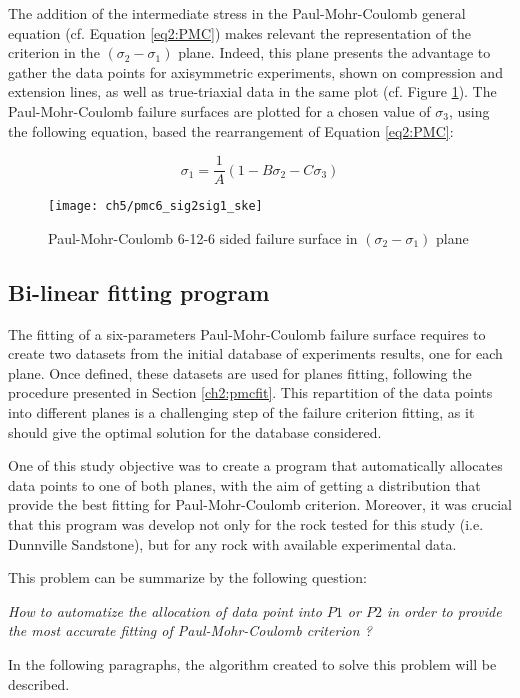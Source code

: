 The addition of the intermediate stress in the Paul-Mohr-Coulomb general equation (cf. Equation \ref{eq2:PMC}) makes relevant the representation of the criterion in the $(\sigma_2-\sigma_1)$ plane. Indeed, this plane presents the advantage to gather the data points for axisymmetric experiments, shown on compression and extension lines, as well as true-triaxial data in the same plot (cf. Figure \ref{fig5:6pmc_sig2sig1}). The Paul-Mohr-Coulomb failure surfaces are plotted for a chosen value of $\sigma_3$, using the following equation, based the rearrangement of Equation \ref{eq2:PMC}:

\begin{equation}\label{eq5:pmc_sig2sig1}
    \sigma_1 = \frac{1}{A}\left(1-B\sigma_{2}-C\sigma_{3}\right)
\end{equation}
\begin{figure}
    \centering
    \texttt{[image: ch5/pmc6\_sig2sig1\_ske]}
    \caption{Paul-Mohr-Coulomb 6-12-6 sided failure surface in $(\sigma_2-\sigma_1)$ plane}
    \label{fig5:6pmc_sig2sig1}
\end{figure}

\subsection{Bi-linear fitting program}

The fitting of a six-parameters Paul-Mohr-Coulomb failure surface requires to create two datasets from the initial database of experiments results, one for each plane. Once defined, these datasets are used for planes fitting, following the procedure presented in Section \ref{ch2:pmcfit}. This repartition of the data points into different planes is a challenging step of the failure criterion fitting, as it should give the optimal solution for the database considered. 

One of this study objective was to create a program that automatically allocates data points to one of both planes, with the aim of getting a distribution that provide the best fitting for Paul-Mohr-Coulomb criterion. Moreover, it was crucial that this program was develop not only for the rock tested for this study (i.e. Dunnville Sandstone), but for any rock with available experimental data. 

This problem can be summarize by the following question:
\begin{center}
    \emph{How to automatize the allocation of data point into $P1$ or $P2$ in order to provide the most accurate fitting of Paul-Mohr-Coulomb criterion ?}
\end{center}
In the following paragraphs, the algorithm created to solve this problem will be described.

